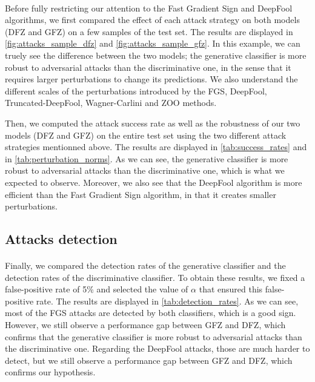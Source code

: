 \documentclass[11pt,twocolumn,letterpaper]{article}
\begin{document}
\paragraph{} Before fully restricting our attention to the Fast Gradient Sign and DeepFool algorithms, we first compared the effect of each attack strategy on both models (DFZ and GFZ) on a few samples of the test set. The results are displayed in \cref{fig:attacks_sample_dfz} and \cref{fig:attacks_sample_gfz}. In this example, we can truely see the difference between the two models; the generative classifier is more robust to adversarial attacks than the discriminative one, in the sense that it requires larger perturbations to change its predictions. We also understand the different scales of the perturbations introduced by the FGS, DeepFool, Truncated-DeepFool, Wagner-Carlini and ZOO methods.

Then, we computed the attack success rate as well as the robustness of our two models (DFZ and GFZ) on the entire test set using the two different attack strategies mentionned above. The results are displayed in \cref{tab:success_rates} and in \cref{tab:perturbation_norms}. As we can see, the generative classifier is more robust to adversarial attacks than the discriminative one, which is what we expected to observe. Moreover, we also see that the DeepFool algorithm is more efficient than the Fast Gradient Sign algorithm, in that it creates smaller perturbations.

\subsection{Attacks detection}

\paragraph{} Finally, we compared the detection rates of the generative classifier and the detection rates of the discriminative classifier. To obtain these results, we fixed a false-positive rate of 5\% and selected the value of $\alpha$ that ensured this false-positive rate. The results are displayed in \cref{tab:detection_rates}. As we can see, most of the FGS attacks are detected by both classifiers, which is a good sign. However, we still observe a performance gap between GFZ and DFZ, which confirms that the generative classifier is more robust to adversarial attacks than the discriminative one. Regarding the DeepFool attacks, those are much harder to detect, but we still observe a performance gap between GFZ and DFZ, which confirms our hypothesis.
\end{document}
